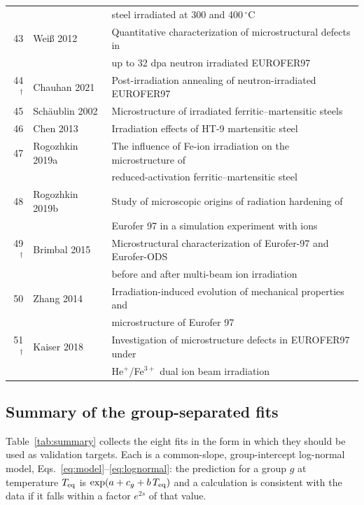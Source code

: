 \begin{table}[htbp]
\begin{tabular}{rll}
                &                & steel irradiated at 300 and 400\,$^{\circ}$C \\
43              & Wei\ss{} 2012   & Quantitative characterization of microstructural defects in \\
                &                & up to 32 dpa neutron irradiated EUROFER97 \\
44$^{\dagger}$ & Chauhan 2021    & Post-irradiation annealing of neutron-irradiated EUROFER97 \\
45              & Sch\"aublin 2002 & Microstructure of irradiated ferritic--martensitic steels \\
46              & Chen 2013       & Irradiation effects of HT-9 martensitic steel \\
47              & Rogozhkin 2019a & The influence of Fe-ion irradiation on the microstructure of \\
                &                & reduced-activation ferritic--martensitic steel \\
48              & Rogozhkin 2019b & Study of microscopic origins of radiation hardening of \\
                &                & Eurofer 97 in a simulation experiment with ions \\
49$^{\dagger}$ & Brimbal 2015    & Microstructural characterization of Eurofer-97 and Eurofer-ODS \\
                &                & before and after multi-beam ion irradiation \\
50              & Zhang 2014      & Irradiation-induced evolution of mechanical properties and \\
                &                & microstructure of Eurofer 97 \\
51$^{\dagger}$ & Kaiser 2018     & Investigation of microstructure defects in EUROFER97 under \\
                &                & He$^{+}$/Fe$^{3+}$ dual ion beam irradiation \\
\bottomrule
\end{tabular}
\end{table}


\subsection{Summary of the group-separated fits}
\label{sec:expdb:summary}

Table~\ref{tab:summary} collects the eight fits in the form in which they should
be used as validation targets. Each is a common-slope, group-intercept log-normal
model, Eqs.~\eqref{eq:model}--\eqref{eq:lognormal}: the prediction for a group $g$
at temperature $T_{\rm eq}$ is $\exp(a + c_g + b\,T_{\rm eq})$ and a calculation
is consistent with the data if it falls within a factor $e^{2s}$ of that value.

